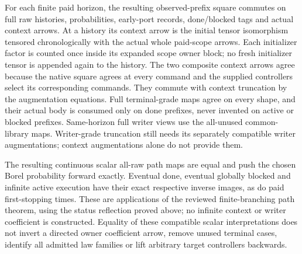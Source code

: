 \documentclass[11pt]{article}\usepackage{amsmath,amssymb,amsthm,geometry}\geometry{margin=1in}\newtheorem{theorem}{Theorem}
\begin{document}
For each finite paid horizon, the resulting observed-prefix square commutes on full raw histories, probabilities, early-port records, done/blocked tags and actual context arrows. At a history its context arrow is the initial tensor isomorphism tensored chronologically with the actual whole paid-scope arrows. Each initializer factor is counted once inside its expanded scope owner block; no fresh initializer tensor is appended again to the history. The two composite context arrows agree because the native square agrees at every command and the supplied controllers select its corresponding commands. They commute with context truncation by the augmentation equations. Full terminal-grade maps agree on every shape, and their actual body is consumed only on done prefixes, never invented on active or blocked prefixes. Same-horizon full writer views use the all-unused common-library maps. Writer-grade truncation still needs its separately compatible writer augmentations; context augmentations alone do not provide them.

The resulting continuous scalar all-raw path maps are equal and push the chosen Borel probability forward exactly. Eventual done, eventual globally blocked and infinite active execution have their exact respective inverse images, as do paid first-stopping times. These are applications of the reviewed finite-branching path theorem, using the status reflection proved above; no infinite context or writer coefficient is constructed. Equality of these compatible scalar interpretations does not invert a directed owner coefficient arrow, remove unused terminal cases, identify all admitted law families or lift arbitrary target controllers backwards.
\end{document}
